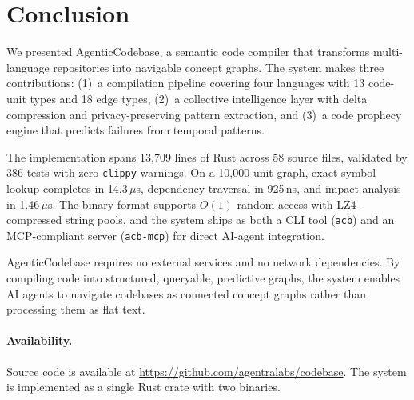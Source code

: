 \documentclass[10pt, twocolumn]{article}
\begin{document}
\section{Conclusion}
\label{sec:conclusion}

We presented AgenticCodebase, a semantic code compiler that transforms multi-language repositories into navigable concept graphs. The system makes three contributions: (1)~a compilation pipeline covering four languages with 13 code-unit types and 18 edge types, (2)~a collective intelligence layer with delta compression and privacy-preserving pattern extraction, and (3)~a code prophecy engine that predicts failures from temporal patterns.

The implementation spans 13{,}709 lines of Rust across 58 source files, validated by 386 tests with zero \texttt{clippy} warnings. On a 10{,}000-unit graph, exact symbol lookup completes in 14.3\,$\mu$s, dependency traversal in 925\,ns, and impact analysis in 1.46\,$\mu$s. The binary format supports $O(1)$ random access with LZ4-compressed string pools, and the system ships as both a CLI tool (\texttt{acb}) and an MCP-compliant server (\texttt{acb-mcp}) for direct AI-agent integration.

AgenticCodebase requires no external services and no network dependencies. By compiling code into structured, queryable, predictive graphs, the system enables AI agents to navigate codebases as connected concept graphs rather than processing them as flat text.

\paragraph{Availability.} Source code is available at \url{https://github.com/agentralabs/codebase}. The system is implemented as a single Rust crate with two binaries.




\end{document}
